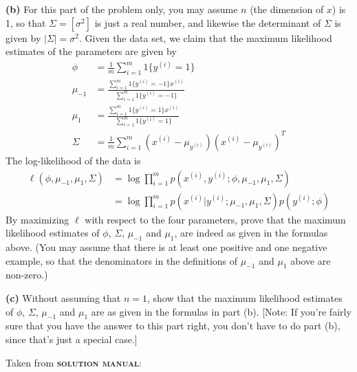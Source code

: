 \documentclass[11pt]{article}
\renewcommand\part[1]{\vspace{.10in}\textbf{(#1)  }}
\begin{document}
\part{b}For this part of the problem only, you may assume $n$ (the dimension of $x$) is 1, so that $\Sigma = [\sigma^2]$ is just a real number, and likewise the determinant of $\Sigma$ is given by $|\Sigma|=\sigma^2$. Given the data set, we claim that the maximum likelihood estimates of the parameters are given by
\begin{align*}
  \phi & = \frac{1}{m}\sum_{i=1}^{m}1\{y^{(i)} = 1\} \\
  \mu_{-1} & =\frac{\sum_{i=1}^{m}1\{y^{(i)} = -1\}x^{(i)}}{\sum_{i=1}^{m}1\{y^{(i)} = -1\}} \\
  \mu_{1} & =\frac{\sum_{i=1}^{m}1\{y^{(i)} = 1\}x^{(i)}}{\sum_{i=1}^{m}1\{y^{(i)} = 1\}} \\
  \Sigma & =\frac{1}{m}\sum_{i=1}^{m}(x^{(i)}-\mu_{y^{(i)}})(x^{(i)}-\mu_{y^{(i)}})^T
\end{align*}
The log-likelihood of the data is
\begin{align*}
  \ell(\phi, \mu_{-1}, \mu_{1}, \Sigma) & = \log \prod_{i=1}^{m}p(x^{(i)}, y^{(i)}; \phi, \mu_{-1}, \mu_{1}, \Sigma) \\
  ~ & =\log \prod_{i=1}^{m}p(x^{(i)}|y^{(i)}; \mu_{-1}, \mu_{1}, \Sigma)p(y^{(i)}; \phi)
\end{align*}
By maximizing $\ell$ with respect to the four parameters, prove that the maximum likelihood estimates of $\phi$, $\Sigma$, $\mu_{-1}$ and $\mu_1$, are indeed as given in the formulas above. (You may assume that there is at least one positive and one negative example, so that the denominators in the definitions of $\mu_{-1}$ and $\mu_1$ above are non-zero.)

\part{c}Without assuming that $n = 1$, show that the maximum likelihood estimates of $\phi$, $\Sigma$, $\mu_{-1}$ and $\mu_1$ are as given in the formulas in part (b). [Note: If you're fairly sure that you have the answer to this part right, you don't have to do part (b), since that's just a special case.]

Taken from \textsc{\textbf{solution manual}}:
\end{document}
